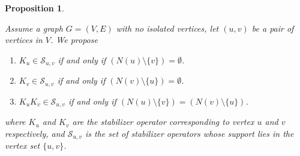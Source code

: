 \documentclass{article}
\newtheorem{prop}[theorem]{Proposition}
\begin{document}
\begin{prop}
\label{prop:conditions_for_belonging_to_support_stabilizer}

Assume a graph $G = (V, E)$ with no isolated vertices, let $(u, v)$ be a pair of vertices in $V$. We propose

\begin{enumerate}
    \item $ K_u \in \mathcal{S}_{u,v} $ if and only if $ (N(u) \setminus \{v\}) = \emptyset $.
    \item $ K_v \in \mathcal{S}_{u,v} $ if and only if $ (N(v) \setminus \{u\}) = \emptyset $.
    \item $ K_u K_v \in \mathcal{S}_{u,v} $ if and only if $ (N(u) \setminus \{v\}) = (N(v) \setminus \{u\}) $.
\end{enumerate}
 where $K_u$ and $K_v$ are the stabilizer operator corresponding to vertex $u$ and $v$ respectively, and $\mathcal{S}_{u,v}$ is the set of stabilizer operators whose support lies in the vertex set $\{u, v\}$. 

\end{prop}
\end{document}
